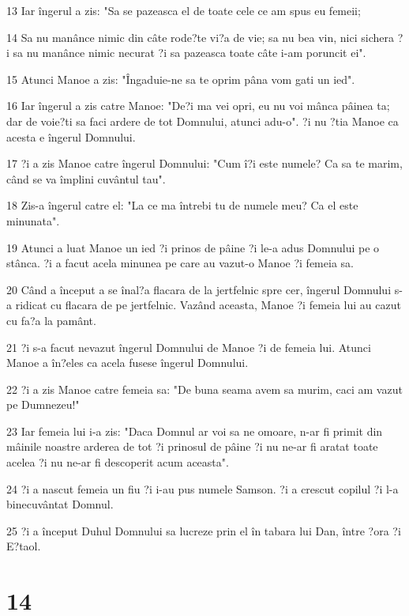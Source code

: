 \par 13 Iar îngerul a zis: "Sa se pazeasca el de toate cele ce am spus eu femeii;
\par 14 Sa nu manânce nimic din câte rode?te vi?a de vie; sa nu bea vin, nici sichera ?i sa nu manânce nimic necurat ?i sa pazeasca toate câte i-am poruncit ei".
\par 15 Atunci Manoe a zis: "Îngaduie-ne sa te oprim pâna vom gati un ied".
\par 16 Iar îngerul a zis catre Manoe: "De?i ma vei opri, eu nu voi mânca pâinea ta; dar de voie?ti sa faci ardere de tot Domnului, atunci adu-o". ?i nu ?tia Manoe ca acesta e îngerul Domnului.
\par 17 ?i a zis Manoe catre îngerul Domnului: "Cum î?i este numele? Ca sa te marim, când se va împlini cuvântul tau".
\par 18 Zis-a îngerul catre el: "La ce ma întrebi tu de numele meu? Ca el este minunata".
\par 19 Atunci a luat Manoe un ied ?i prinos de pâine ?i le-a adus Domnului pe o stânca. ?i a facut acela minunea pe care au vazut-o Manoe ?i femeia sa.
\par 20 Când a început a se înal?a flacara de la jertfelnic spre cer, îngerul Domnului s-a ridicat cu flacara de pe jertfelnic. Vazând aceasta, Manoe ?i femeia lui au cazut cu fa?a la pamânt.
\par 21 ?i s-a facut nevazut îngerul Domnului de Manoe ?i de femeia lui. Atunci Manoe a în?eles ca acela fusese îngerul Domnului.
\par 22 ?i a zis Manoe catre femeia sa: "De buna seama avem sa murim, caci am vazut pe Dumnezeu!"
\par 23 Iar femeia lui i-a zis: "Daca Domnul ar voi sa ne omoare, n-ar fi primit din mâinile noastre arderea de tot ?i prinosul de pâine ?i nu ne-ar fi aratat toate acelea ?i nu ne-ar fi descoperit acum aceasta".
\par 24 ?i a nascut femeia un fiu ?i i-au pus numele Samson. ?i a crescut copilul ?i l-a binecuvântat Domnul.
\par 25 ?i a început Duhul Domnului sa lucreze prin el în tabara lui Dan, între ?ora ?i E?taol.

\chapter{14}

